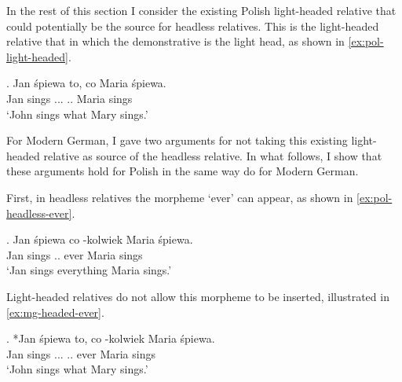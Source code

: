 In the rest of this section I consider the existing Polish light-headed relative that could potentially be the source for headless relatives. This is the light-headed relative that in which the demonstrative is the light head, as shown in \ref{ex:pol-light-headed}.

\exg. Jan śpiewa to, co Maria śpiewa.\\
Jan sings ... .. Maria sings\\
`John sings what Mary sings.' \label{ex:pol-light-headed}

For Modern German, I gave two arguments for not taking this existing light-headed relative as source of the headless relative. In what follows, I show that these arguments hold for Polish in the same way do for Modern German.

First, in headless relatives the morpheme  `ever' can appear, as shown in \ref{ex:pol-headless-ever}.

\exg. Jan śpiewa co -kolwiek Maria śpiewa.\\
Jan sings .. ever Maria sings\\
`Jan sings everything Maria sings.' \label{ex:pol-headless-ever}

Light-headed relatives do not allow this morpheme to be inserted, illustrated in \ref{ex:mg-headed-ever}.

\exg. *Jan śpiewa to, co -kolwiek Maria śpiewa.\\
Jan sings ... .. ever Maria sings\\
`John sings what Mary sings.' \label{ex:pol-headed-ever}


